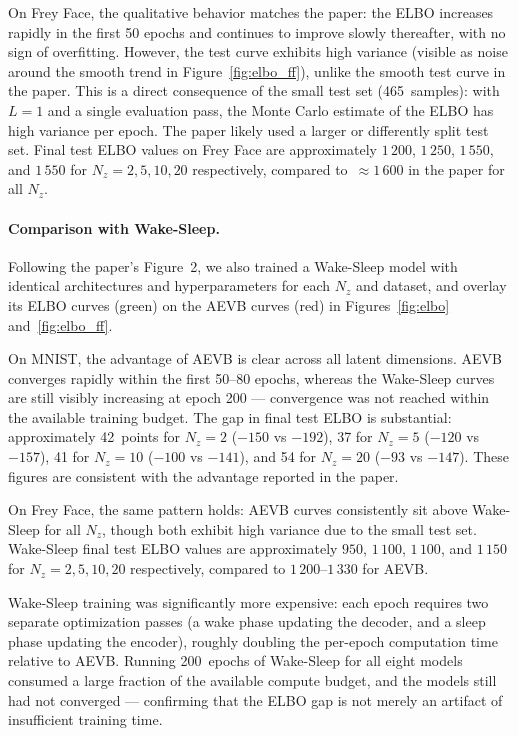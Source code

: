 \documentclass{article}
\begin{document}
On Frey Face, the qualitative behavior matches the paper: the ELBO increases rapidly
in the first 50 epochs and continues to improve slowly thereafter, with no sign of
overfitting. However, the test curve exhibits high variance (visible as noise around
the smooth trend in Figure~\ref{fig:elbo_ff}), unlike the smooth test curve in the
paper. This is a direct consequence of the small test set (465~samples): with $L=1$
and a single evaluation pass, the Monte Carlo estimate of the ELBO has high variance
per epoch. The paper likely used a larger or differently split test set. Final test
ELBO values on Frey Face are approximately $1\,200$, $1\,250$, $1\,550$, and
$1\,550$ for $N_z = 2, 5, 10, 20$ respectively, compared to~$\approx 1\,600$ in
the paper for all $N_z$.

\paragraph{Comparison with Wake-Sleep.}
Following the paper's Figure~2, we also trained a Wake-Sleep model with identical
architectures and hyperparameters for each $N_z$ and dataset, and overlay its ELBO
curves (green) on the AEVB curves (red) in Figures~\ref{fig:elbo} and~\ref{fig:elbo_ff}.

On MNIST, the advantage of AEVB is clear across all latent dimensions. AEVB converges
rapidly within the first 50--80 epochs, whereas the Wake-Sleep curves are still
visibly increasing at epoch 200 --- convergence was not reached within the available
training budget. The gap in final test ELBO is substantial: approximately 42~points
for $N_z=2$ ($-150$ vs $-192$), 37 for $N_z=5$ ($-120$ vs $-157$), 41 for $N_z=10$
($-100$ vs $-141$), and 54 for $N_z=20$ ($-93$ vs $-147$). These figures are consistent
with the advantage reported in the paper.

On Frey Face, the same pattern holds: AEVB curves consistently sit above Wake-Sleep
for all $N_z$, though both exhibit high variance due to the small test set.
Wake-Sleep final test ELBO values are approximately $950$, $1\,100$, $1\,100$,
and $1\,150$ for $N_z = 2, 5, 10, 20$ respectively, compared to $1\,200$--$1\,330$
for AEVB.

Wake-Sleep training was significantly more expensive: each epoch requires two separate
optimization passes (a wake phase updating the decoder, and a sleep phase updating
the encoder), roughly doubling the per-epoch computation time relative to AEVB.
Running 200~epochs of Wake-Sleep for all eight models consumed a large fraction of
the available compute budget, and the models still had not converged --- confirming
that the ELBO gap is not merely an artifact of insufficient training time.
\end{document}
